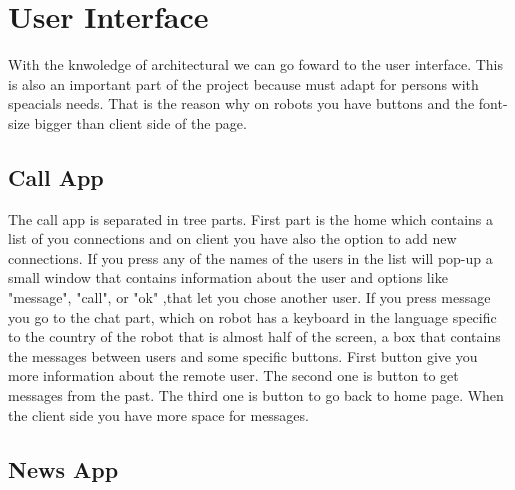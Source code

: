\chapter{User Interface}
\label{chapter:user-interface}
With the knwoledge of architectural we can go foward to the user interface. This is also
an important part of the project because must adapt for persons with speacials needs.
That is the reason why on robots you have buttons and the font-size bigger than client
side of the page.


\section{Call App}
\label{sec:ui-callapp}
The call app is separated in tree parts. First part is the home which contains a list
of you connections and on client you have also the option to add new connections. If you
press any of the names of the users in the list will pop-up a small window that contains
information about the user and options like "message", "call", or "ok" ,that let you chose another
user. If you press message you go to the chat part, which on robot has a keyboard in the
language specific to the country of the robot that is almost half of the screen, a box that
contains the messages between users and some specific buttons. First button give you more
information about the remote user. The second one is button to get messages from the past.
The third one is button to go back to home page. When the client side you have more space
for messages.


\section{News App}
\label{sec:ui-newsapp}